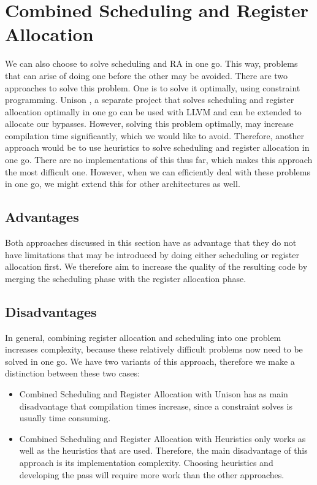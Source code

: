 \section{Combined Scheduling and Register Allocation}\label{sec:combined_sched_ra}
We can also choose to solve scheduling and RA in one go. This way, problems that can arise of doing one before the other may be avoided. There are two approaches to solve this problem. One is to solve it optimally, using constraint programming. Unison \cite{unison}, a separate project that solves scheduling and register allocation optimally in one go can be used with LLVM and can be extended to allocate our bypasses. However, solving this problem optimally, may increase compilation time significantly, which we would like to avoid. Therefore, another approach would be to use heuristics to solve scheduling and register allocation in one go. There are no implementations of this thus far, which makes this approach the most difficult one. However, when we can efficiently deal with these problems in one go, we might extend this for other architectures as well. 

\subsection{Advantages}
Both approaches discussed in this section have as advantage that they do not have limitations that may be introduced by doing either scheduling or register allocation first. We therefore aim to increase the quality of the resulting code by merging the scheduling phase with the register allocation phase. 

\subsection{Disadvantages}
In general, combining register allocation and scheduling into one problem increases complexity, because these relatively difficult problems now need to be solved in one go. 
We have two variants of this approach, therefore we make a distinction between these two cases:
\begin{itemize}
\item Combined Scheduling and Register Allocation with Unison has as main disadvantage that compilation times increase, since a constraint solves is usually time consuming.
\item Combined Scheduling and Register Allocation with Heuristics only works as well as the heuristics that are used. Therefore, the main disadvantage of this approach is its implementation complexity. Choosing heuristics and developing the pass will require more work than the other approaches.
\end{itemize}